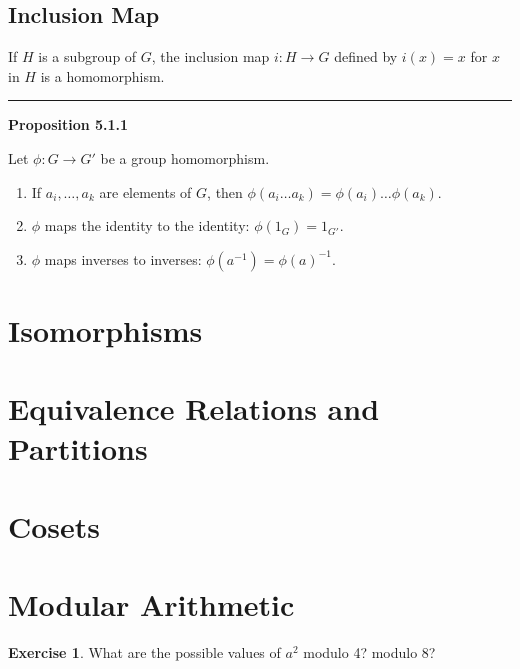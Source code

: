 \documentclass[
]{book}
\theoremstyle{definition}
\theoremstyle{definition}
\theoremstyle{definition}
\newtheorem{exercise}{Exercise}[chapter]
\theoremstyle{definition}
\theoremstyle{remark}
\begin{document}
\hypertarget{inclusion-map}{%
\subsection{Inclusion Map}\label{inclusion-map}}

If \(H\) is a subgroup of \(G\), the inclusion map \(i: H \rightarrow G\) defined by \(i(x) = x\) for \(x\) in \(H\) is a homomorphism.

\begin{center}\rule{0.5\linewidth}{0.5pt}\end{center}

\textbf{Proposition 5.1.1}

Let \(\phi: G \rightarrow G'\) be a group homomorphism.

\begin{enumerate}
\def\labelenumi{(\alph{enumi})}
\item
  If \(a_i, \ldots, a_k\) are elements of \(G\), then \(\phi(a_i \ldots a_k) = \phi(a_i) \ldots \phi(a_k)\).
\item
  \(\phi\) maps the identity to the identity: \(\phi(1_G) = 1_{G'}\).
\item
  \(\phi\) maps inverses to inverses: \(\phi(a^{-1}) = \phi(a)^{-1}\).
\end{enumerate}

\hypertarget{isomorphisms}{%
\section{Isomorphisms}\label{isomorphisms}}

\hypertarget{equivalence-relations-and-partitions}{%
\section{Equivalence Relations and Partitions}\label{equivalence-relations-and-partitions}}

\hypertarget{cosets}{%
\section{Cosets}\label{cosets}}

\hypertarget{modular-arithmetic}{%
\section{Modular Arithmetic}\label{modular-arithmetic}}

\begin{exercise}
\protect\hypertarget{exr:unnamed-chunk-15}{}\label{exr:unnamed-chunk-15}What are the possible values of \(a^2\) modulo 4? modulo 8?
\end{exercise}
\end{document}
